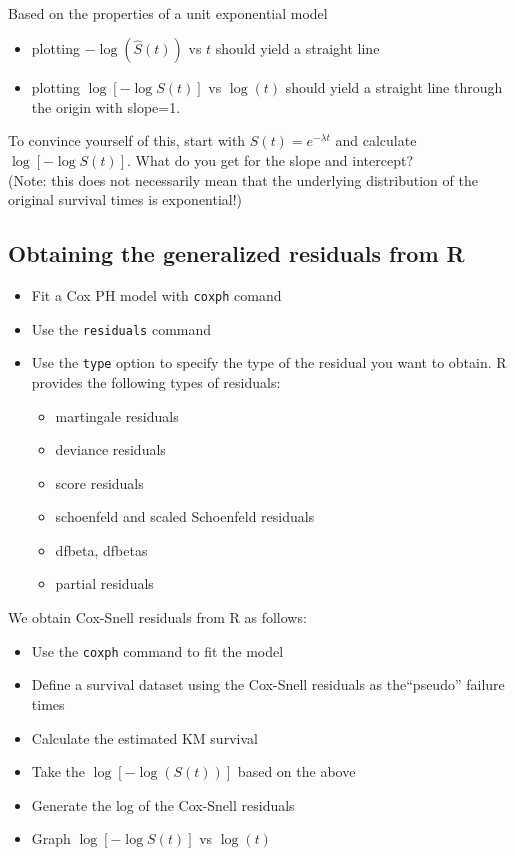 \documentclass[11pt]{book}
\begin{document}
\\[2ex]
Based on the properties of a unit exponential model
\begin{itemize}
\item plotting $-\log(\hat{S}(t))$ vs $t$ should yield a straight line
\item plotting $\log[-\log{S}(t)]$ vs $\log(t)$ should yield a
straight line through the origin with slope=1.
\end{itemize}
To convince yourself of this, start with $S(t)=e^{-\lambda t}$ and
calculate $\log[-\log{S}(t)]$.  What do you get for the slope and intercept?
\\[2ex]
(Note: this does not necessarily mean that the underlying
distribution of the original survival times is exponential!)
\subsection{Obtaining the generalized residuals from R}
\begin{itemize}
\item Fit a Cox PH model with {\tt coxph} comand
\item Use the {\tt residuals} command
\item Use the {\tt type} option to specify the type of the residual you want to obtain. R provides the following types of residuals:
\begin{itemize}
  \item martingale residuals
  \item deviance residuals
  \item score residuals
  \item schoenfeld and scaled Schoenfeld residuals
  \item dfbeta, dfbetas
  \item partial residuals
\end{itemize}
\end{itemize}
We obtain Cox-Snell residuals from R as follows:
\begin{itemize}
\item Use the {\tt coxph} command to fit the model
\item Define a survival dataset using the Cox-Snell residuals as the``pseudo'' failure times
\item Calculate the estimated KM survival
\item Take the $\log[-\log(S(t))]$ based on the above
\item Generate the log of the Cox-Snell residuals
\item Graph $\log[-\log{S}(t)]$ vs $\log(t)$
\end{itemize}
\end{document}
